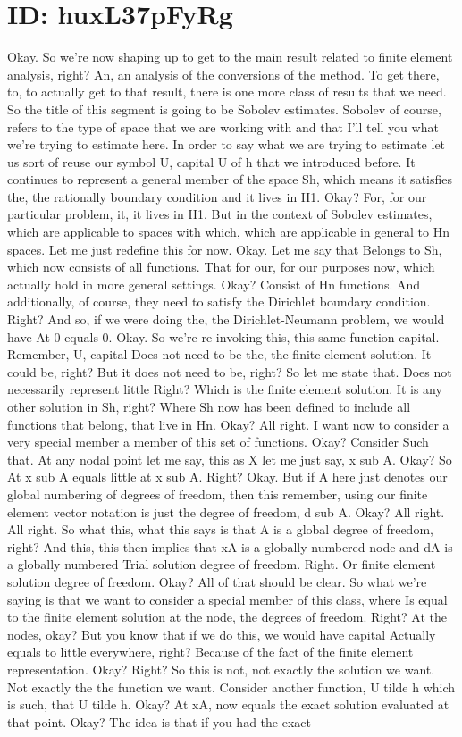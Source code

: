 \documentclass[10pt]{article}
\begin{document}
{\section*{ID: huxL37pFyRg}
Okay. So we're now shaping up to get to the main result related to finite element analysis, right? An, an analysis of the conversions of the method. To get there, to, to actually get to that result, there is one more class of results that we need. So the title of this segment is going to be Sobolev estimates. Sobolev of course, refers to the type of space that we are working with and that I'll tell you what we're trying to estimate here. In order to say what we are trying to estimate let us sort of reuse our symbol U, capital U of h that we introduced before. It continues to represent a general member of the space Sh, which means it satisfies the, the rationally boundary condition and it lives in H1. Okay? For, for our particular problem, it, it lives in H1. But in the context of Sobolev estimates, which are applicable to spaces with which, which are applicable in general to Hn spaces. Let me just redefine this for now. Okay. Let me say that Belongs to Sh, which now consists of all functions. That for our, for our purposes now, which actually hold in more general settings. Okay? Consist of Hn functions. And additionally, of course, they need to satisfy the Dirichlet boundary condition. Right? And so, if we were doing the, the Dirichlet-Neumann problem, we would have At 0 equals 0. Okay. So we're re-invoking this, this same function capital. Remember, U, capital Does not need to be the, the finite element solution. It could be, right? But it does not need to be, right? So let me state that. Does not necessarily represent little Right? Which is the finite element solution. It is any other solution in Sh, right? Where Sh now has been defined to include all functions that belong, that live in Hn. Okay? All right. I want now to consider a very special member a member of this set of functions. Okay? Consider Such that. At any nodal point let me say, this as X let me just say, x sub A. Okay? So At x sub A equals little at x sub A. Right? Okay. But if A here just denotes our global numbering of degrees of freedom, then this remember, using our finite element vector notation is just the degree of freedom, d sub A. Okay? All right. All right. So what this, what this says is that A is a global degree of freedom, right? And this, this then implies that xA is a globally numbered node and dA is a globally numbered Trial solution degree of freedom. Right. Or finite element solution degree of freedom. Okay? All of that should be clear. So what we're saying is that we want to consider a special member of this class, where Is equal to the finite element solution at the node, the degrees of freedom. Right? At the nodes, okay? But you know that if we do this, we would have capital Actually equals to little everywhere, right? Because of the fact of the finite element representation. Okay? Right? So this is not, not exactly the solution we want. Not exactly the the function we want. Consider another function, U tilde h which is such, that U tilde h. Okay? At xA, now equals the exact solution evaluated at that point. Okay? The idea is that if you had the exact }
\end{document}
